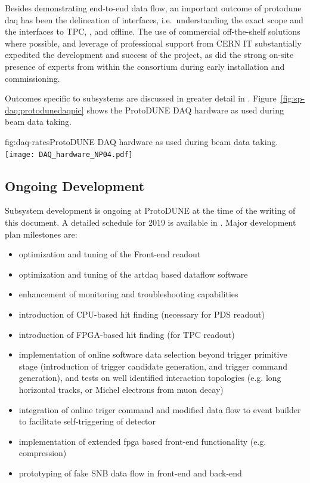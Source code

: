 Besides demonstrating end-to-end data flow, an important outcome of
protodune daq has been the delineation of
interfaces, i.e.~understanding the exact  scope and the interfaces to TPC, , and offline. The use of commercial off-the-shelf solutions
where possible, and leverage of professional support from CERN IT 
substantially expedited the development and success of the project, as
did the strong on-site presence of experts from within the consortium during early installation and
commissioning. 

Outcomes specific to  subsystems are discussed in
greater detail in \cite{talkfromCDR}. Figure~\ref{fig:sp-daq:protodunedaqpic} shows the 
ProtoDUNE DAQ hardware as used during beam data taking.

\begin{dunefigure}{fig:daq-rates}{ProtoDUNE DAQ hardware as used during beam data taking. \label{fig:sp-daq:protodunedaqpic}}
  \texttt{[image: DAQ\_hardware\_NP04.pdf]}
\end{dunefigure}


\subsection{Ongoing Development}
\label{sec:sp-daq:design-validation}


Subsystem development is ongoing at ProtoDUNE at the time of the
writing of this document. A detailed schedule for 2019 is available
in \cite{referencedocdbfromgiovanna}. Major development plan milestones are:
\begin{itemize}
\item optimization and tuning of the Front-end readout
\item optimization and tuning of the artdaq based dataflow software
\item enhancement of monitoring and troubleshooting capabilities
\item introduction of CPU-based hit finding (necessary for PDS readout)
\item introduction of FPGA-based hit finding (for TPC readout)
\item implementation of online software data selection beyond trigger
primitive stage (introduction of trigger candidate generation, and
trigger command generation), and tests on well identified interaction
topologies (e.g. long horizontal tracks, or Michel electrons from muon decay)
\item integration of online triger command and modified data flow to event
builder to facilitate self-triggering of detector
\item implementation of extended fpga based front-end functionality
(e.g. compression)
\item prototyping of fake SNB data flow in front-end and back-end
\end{itemize}

